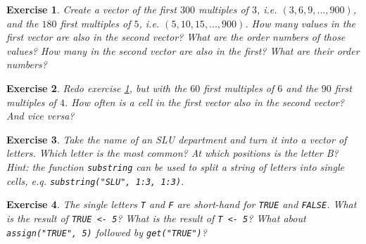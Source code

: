 \documentclass{article}\usepackage[]{graphicx}\usepackage[]{color}
\newtheorem{exercise}{Exercise}[section]
\begin{document}
\begin{exercise} \label{multiples}
Create a vector of the first $300$ multiples of $3$, i.e. $(3,6,9,...,900)$, and the $180$ first multiples of $5$, i.e. $(5,10,15,...,900)$. How many values in the first vector are also in the second vector? What are the order numbers of those values? How many in the second vector are also in the first? What are their order numbers?
\end{exercise}

\begin{exercise}
Redo exercise \ref{multiples}, but with the $60$ first multiples of $6$ and the $90$ first multiples of $4$. How often is a cell in the first vector also in the second vector? And vice versa?
\end{exercise}

\begin{exercise}
Take the name of an SLU department and turn it into a vector of letters. Which letter is the most common? At which positions is the letter B? Hint: the function \texttt{substring} can be used to split a string of letters into single cells, e.q. \texttt{substring("SLU", 1:3, 1:3)}.
\end{exercise}

\begin{exercise}
The single letters \texttt{T} and \texttt{F} are short-hand for \texttt{TRUE} and \texttt{FALSE}. What is the result of \texttt{TRUE <- 5}? What is the result of \texttt{T <- 5}? What about \texttt{assign("TRUE", 5)} followed by \texttt{get("TRUE")}?
\end{exercise}
\end{document}
